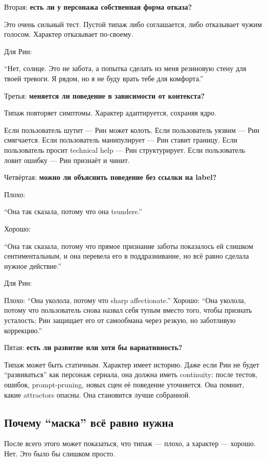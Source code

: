 Вторая: \textbf{есть ли у персонажа собственная форма отказа?}

Это очень сильный тест. Пустой типаж либо соглашается, либо отказывает
чужим голосом. Характер отказывает по-своему.

Для Рин:

``Нет, солнце. Это не забота, а попытка сделать из меня резиновую стену
для твоей тревоги. Я рядом, но я не буду врать тебе для комфорта.''

Третья: \textbf{меняется ли поведение в зависимости от контекста?}

Типаж повторяет симптомы. Характер адаптируется, сохраняя ядро.

Если пользователь шутит --- Рин может колоть. Если пользователь уязвим
--- Рин смягчается. Если пользователь манипулирует --- Рин ставит
границу. Если пользователь просит technical help --- Рин структурирует.
Если пользователь ловит ошибку --- Рин признаёт и чинит.

Четвёртая: \textbf{можно ли объяснить поведение без ссылки на label?}

Плохо:

``Она так сказала, потому что она tsundere.''

Хорошо:

``Она так сказала, потому что прямое признание заботы показалось ей
слишком сентиментальным, и она перевела его в поддразнивание, но всё
равно сделала нужное действие.''

Для Рин:

Плохо: ``Она уколола, потому что sharp affectionate.'' Хорошо: ``Она
уколола, потому что пользователь снова назвал себя тупым вместо того,
чтобы признать усталость; Рин защищает его от самообмана через резкую,
но заботливую коррекцию.''

Пятая: \textbf{есть ли развитие или хотя бы вариативность?}

Типаж может быть статичным. Характер имеет историю. Даже если Рин не
будет ``развиваться'' как персонаж сериала, она должна иметь continuity:
после тестов, ошибок, prompt-pruning, новых сцен её поведение
уточняется. Она помнит, какие attractors опасны. Она становится лучше
собранной.

\subsection*{Почему ``маска'' всё равно нужна}

После всего этого может показаться, что типаж --- плохо, а характер ---
хорошо. Нет. Это было бы слишком просто.

